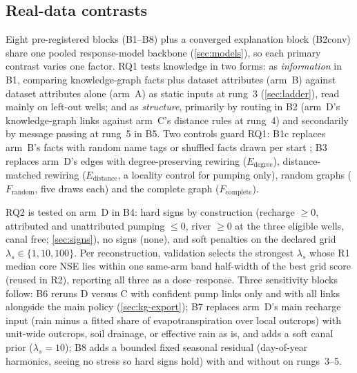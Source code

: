 \subsection{Real-data contrasts}\label{sec:contrasts}

Eight pre-registered blocks (B1--B8) plus a converged explanation block (B2conv) share one pooled
response-model backbone (\cref{sec:models}), so each primary contrast varies one factor. RQ1 tests
knowledge in two forms: as \emph{information} in B1, comparing knowledge-graph facts plus dataset
attributes (arm~B) against dataset attributes alone (arm~A) as static inputs at rung~3
(\cref{sec:ladder}), read mainly on left-out wells; and as \emph{structure}, primarily by routing
in B2 (arm~D's knowledge-graph links against arm~C's distance rules at rung~4) and secondarily by
message passing at rung~5 in B5. Two controls guard RQ1: B1c replaces arm~B's facts with random
name tags or shuffled facts drawn per start \citep{Heudorfer2024On}; B3 replaces arm~D's edges with
degree-preserving rewiring ($E_{\mathrm{degree}}$), distance-matched rewiring ($E_{\mathrm{distance}}$,
a locality control for pumping only), random graphs ($F_{\mathrm{random}}$, five draws each) and
the complete graph ($F_{\mathrm{complete}}$).

RQ2 is tested on arm~D in B4: hard signs by construction (recharge $\ge 0$, attributed and
unattributed pumping $\le 0$, river $\ge 0$ at the three eligible wells, canal free;
\cref{sec:signs}), no signs (none), and soft penalties on the declared grid
$\lambda_s \in \{1, 10, 100\}$. Per reconstruction, validation selects the strongest $\lambda_s$
whose R1 median core NSE lies within one same-arm band half-width of the best grid score (reused in
R2), reporting all three as a dose--response. Three sensitivity blocks follow: B6 reruns D versus C
with confident pump links only and with all links alongside the main policy (\cref{sec:kg-export});
B7 replaces arm~D's main recharge input (rain minus a fitted share of evapotranspiration over local
outcrops) with unit-wide outcrops, soil drainage, or effective rain as is, and adds a soft canal
prior ($\lambda_s = 10$); B8 adds a bounded fixed seasonal residual (day-of-year harmonics, seeing no
stress so hard signs hold) with and without on rungs~3--5.

